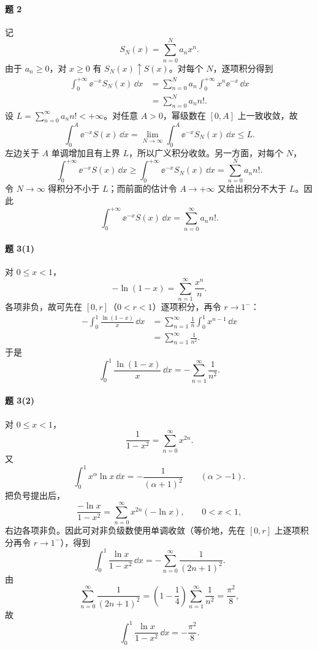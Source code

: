 \paragraph{题 2}
\begin{xsolution}
记
\[
  S_N(x)=\sum_{n=0}^N a_nx^n.
\]
由于 $a_n\geqslant0$，对 $x\geqslant0$ 有 $S_N(x)\uparrow S(x)$。对每个 $N$，逐项积分得到
\[
\begin{aligned}
  \int_0^{+\infty}\ee^{-x}S_N(x)\,\dd x
  &=\sum_{n=0}^Na_n\int_0^{+\infty}x^n\ee^{-x}\,\dd x\\
  &=\sum_{n=0}^Na_nn!.
\end{aligned}
\]
设 $L=\sum_{n=0}^{\infty}a_nn!<+\infty$。对任意 $A>0$，幂级数在 $[0,A]$ 上一致收敛，故
\[
  \int_0^A\ee^{-x}S(x)\,\dd x
  =\lim_{N\to\infty}\int_0^A\ee^{-x}S_N(x)\,\dd x
  \leqslant L.
\]
左边关于 $A$ 单调增加且有上界 $L$，所以广义积分收敛。另一方面，对每个 $N$，
\[
  \int_0^{+\infty}\ee^{-x}S(x)\,\dd x
  \geqslant\int_0^{+\infty}\ee^{-x}S_N(x)\,\dd x
  =\sum_{n=0}^Na_nn!.
\]
令 $N\to\infty$ 得积分不小于 $L$；而前面的估计令 $A\to+\infty$ 又给出积分不大于 $L$。因此
\[
  \int_0^{+\infty}\ee^{-x}S(x)\,\dd x
  =\sum_{n=0}^{\infty}a_nn!.
\]
\end{xsolution}

\paragraph{题 3(1)}
\begin{xsolution}
对 $0\leqslant x<1$，
\[
  -\ln(1-x)=\sum_{n=1}^{\infty}\frac{x^n}{n}.
\]
各项非负，故可先在 $[0,r]$（$0<r<1$）逐项积分，再令 $r\to1^-$：
\[
\begin{aligned}
  -\int_0^1\frac{\ln(1-x)}x\,\dd x
  &=\sum_{n=1}^{\infty}\frac1n\int_0^1x^{n-1}\,\dd x\\
  &=\sum_{n=1}^{\infty}\frac1{n^2}.
\end{aligned}
\]
于是
\[
  \int_0^1\frac{\ln(1-x)}x\,\dd x
  =-\sum_{n=1}^{\infty}\frac1{n^2}.
\]
\end{xsolution}

\paragraph{题 3(2)}
\begin{xsolution}
对 $0\leqslant x<1$，
\[
  \frac1{1-x^2}=\sum_{n=0}^{\infty}x^{2n}.
\]
又
\[
  \int_0^1x^{\alpha}\ln x\,\dd x=-\frac1{(\alpha+1)^2}\qquad(\alpha>-1).
\]
把负号提出后，
\[
  \frac{-\ln x}{1-x^2}=\sum_{n=0}^{\infty}x^{2n}(-\ln x),
  \qquad 0<x<1,
\]
右边各项非负。因此可对非负级数使用单调收敛（等价地，先在 $[0,r]$ 上逐项积分再令 $r\to1^-$），得到
\[
  \int_0^1\frac{\ln x}{1-x^2}\,\dd x
  =-\sum_{n=0}^{\infty}\frac1{(2n+1)^2}.
\]
由
\[
  \sum_{n=0}^{\infty}\frac1{(2n+1)^2}
  =\left(1-\frac14\right)\sum_{n=1}^{\infty}\frac1{n^2}
  =\frac{\pi^2}{8},
\]
故
\[
  \int_0^1\frac{\ln x}{1-x^2}\,\dd x=-\frac{\pi^2}{8}.
\]
\end{xsolution}


